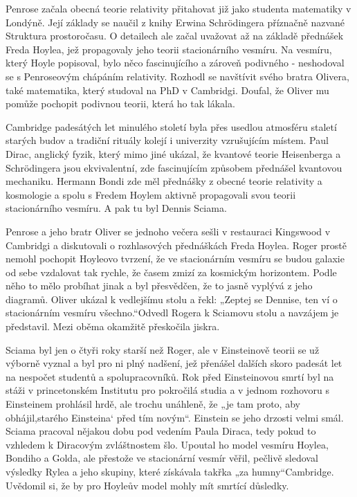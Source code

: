   Penrose začala obecná teorie relativity přitahovat již jako studenta matematiky v Londýně. Její
  základy se naučil z knihy Erwina Schrödingera příznačně nazvané Struktura prostoročasu. O
  detailech ale začal uvažovat až na základě přednášek Freda Hoylea, jež propagovaly jeho teorii
  stacionárního vesmíru. Na vesmíru, který Hoyle popisoval, bylo něco fascinujícího a zároveň
  podivného - neshodoval se s Penroseovým chápáním relativity. Rozhodl se navštívit svého bratra
  Olivera, také matematika, který studoval na PhD v Cambridgi. Doufal, že Oliver mu pomůže pochopit
  podivnou teorii, která ho tak lákala. 

  Cambridge padesátých let minulého století byla přes usedlou atmosféru staletí starých budov a
  tradiční rituály kolejí i univerzity vzrušujícím místem. Paul Dirac, anglický fyzik, který mimo
  jiné ukázal, že kvantové teorie Heisenberga a Schrödingera jsou ekvivalentní, zde fascinujícím
  způsobem přednášel kvantovou mechaniku. Hermann Bondi zde měl přednášky z obecné teorie relativity
  a kosmologie a spolu s Fredem Hoylem aktivně propagovali svou teorii stacionárního vesmíru. A pak
  tu byl Dennis Sciama. 

  Penrose a jeho bratr Oliver se jednoho večera sešli v restauraci Kingswood v Cambridgi a
  diskutovali o rozhlasových přednáškách Freda Hoylea. Roger prostě nemohl pochopit Hoyleovo
  tvrzení, že ve stacionárním vesmíru se budou galaxie od sebe vzdalovat tak rychle, že časem zmizí
  za kosmickým horizontem. Podle něho to mělo probíhat jinak a byl přesvědčen, že to jasně vyplývá z
  jeho diagramů. Oliver ukázal k vedlejšímu stolu a řekl: „Zeptej se Dennise, ten ví o stacionárním
  vesmíru všechno.“Odvedl Rogera k Sciamovu stolu a navzájem je představil. Mezi oběma okamžitě
  přeskočila jiskra. 

  Sciama byl jen o čtyři roky starší než Roger, ale v Einsteinově teorii se už výborně vyznal a byl
  pro ni plný nadšení, jež přenášel dalších skoro padesát let na nespočet studentů a
  spolupracovníků. Rok před Einsteinovou smrtí byl na stáži v princetonském Institutu pro pokročilá
  studia a v jednom rozhovoru s Einsteinem prohlásil hrdě, ale trochu unáhleně, že „je tam proto,
  aby obhájil,starého Einsteina‘ před tím novým“. Einstein se jeho drzosti velmi smál. Sciama
  pracoval nějakou dobu pod vedením Paula Diraca, tedy pokud to vzhledem k Diracovým zvláštnostem
  šlo. Upoutal ho model vesmíru Hoylea, Bondiho a Golda, ale přestože ve stacionární vesmír věřil,
  pečlivě sledoval výsledky Rylea a jeho skupiny, které získávala takřka „za humny“Cambridge.
  Uvědomil si, že by pro Hoyleův model mohly mít smrtící důsledky. 

